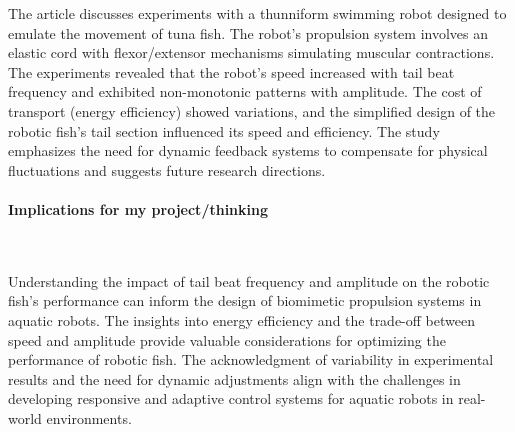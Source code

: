 The article discusses experiments with a thunniform swimming robot designed to emulate the movement of tuna fish. The robot's propulsion system involves an elastic cord with flexor/extensor mechanisms simulating muscular contractions. The experiments revealed that the robot's speed increased with tail beat frequency and exhibited non-monotonic patterns with amplitude. The cost of transport (energy efficiency) showed variations, and the simplified design of the robotic fish's tail section influenced its speed and efficiency. The study emphasizes the need for dynamic feedback systems to compensate for physical fluctuations and suggests future research directions.

\vspace*{-0.5cm}
\paragraph{Implications for my project/thinking} \

Understanding the impact of tail beat frequency and amplitude on the robotic fish's performance can inform the design of biomimetic propulsion systems in aquatic robots. The insights into energy efficiency and the trade-off between speed and amplitude provide valuable considerations for optimizing the performance of robotic fish.
The acknowledgment of variability in experimental results and the need for dynamic adjustments align with the challenges in developing responsive and adaptive control systems for aquatic robots in real-world environments.